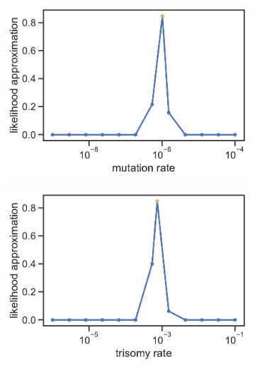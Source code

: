 \documentclass[12pt]{extarticle}
\begin{document}

\begin{figure}[p]
  \centering
  \begin{subfigure}{0.3\textwidth}
      \includegraphics[width=\textwidth]{../figures/sensitivity-mutation-rate-plot.pdf}      
      \label{fig:sensitivity-mutation}
  \end{subfigure}
  \begin{subfigure}{0.3\textwidth}
      \includegraphics[width=\textwidth]{../figures/sensitivity-trisomy-rate-plot.pdf}      
      \label{fig:sensitivity-aneuploidy}
  \end{subfigure}
   \begin{subfigure}{0.3\textwidth}

\end{subfigure}
\end{figure}
\end{document}
